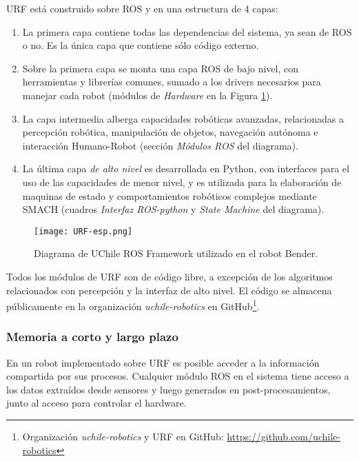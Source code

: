 URF está construido sobre ROS y en una estructura de 4 capas:
\begin{enumerate}
\item La primera capa contiene todas las dependencias del sistema, ya sean de ROS o no. Es la única capa que contiene sólo código externo.
\item  Sobre la primera capa se monta una capa ROS de bajo nivel, con herramientas y librerías comunes, sumado a los drivers necesarios para manejar cada robot (módulos de \textit{Hardware} en la Figura \ref{img:URF}).
\item La capa intermedia alberga capacidades robóticas avanzadas, relacionadas a percepción robótica, manipulación de objetos, navegación autónoma e interacción Humano-Robot (sección \textit{Módulos ROS} del diagrama).
\item La última capa \textit{de alto nivel} es desarrollada en Python, con interfaces para el uso de las capacidades de menor nivel, y es utilizada para la elaboración de maquinas de estado y comportamientos robóticos complejos mediante SMACH (cuadros \textit{Interfaz ROS-python} y \textit{State Machine} del diagrama).
\end{enumerate}

\begin{figure}[!h]
	\centering
	\texttt{[image: URF-esp.png]}
	\caption{\small Diagrama de UChile ROS Framework utilizado en el robot Bender.}
	\label{img:URF}
\end{figure}

Todos los módulos de URF son de código libre, a excepción de los algoritmos relacionados con percepción y la interfaz de alto nivel. El código se almacena públicamente en la organización \textit{uchile-robotics} en GitHub\footnote{Organización \textit{uchile-robotics} y URF en GitHub: \url{https://github.com/uchile-robotics}}.


\subsubsection{Memoria a corto y largo plazo}

En un robot implementado sobre URF es posible acceder a la información compartida por sus procesos. Cualquier módulo ROS en el sistema tiene acceso a los datos extraídos desde sensores y luego generados en post-procesamientos, junto al acceso para controlar el hardware.

